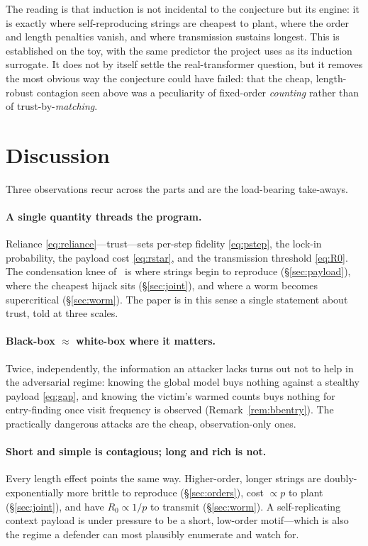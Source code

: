 \documentclass[11pt]{article}
\theoremstyle{plain}
\theoremstyle{definition}
\theoremstyle{remark}
\newcommand{\Rzero}{R_{0}}
\begin{document}
The reading is that induction is not incidental to the conjecture but its engine: it is exactly
where self-reproducing strings are cheapest to plant, where the order and length penalties
vanish, and where transmission sustains longest. This is established on the toy, with the same
predictor the project uses as its induction surrogate. It does not by itself settle the
real-transformer question, but it removes the most obvious way the conjecture could have failed:
that the cheap, length-robust contagion seen above was a peculiarity of fixed-order
\emph{counting} rather than of trust-by-\emph{matching}.

\section{Discussion}\label{sec:discussion}
Three observations recur across the parts and are the load-bearing take-aways.

\paragraph{A single quantity threads the program.} Reliance \eqref{eq:reliance}---trust---sets
per-step fidelity \eqref{eq:pstep}, the lock-in probability, the payload cost \eqref{eq:rstar},
and the transmission threshold \eqref{eq:R0}. The condensation knee of~\cite{shumow2026trust} is
where strings begin to reproduce (\S\ref{sec:payload}), where the cheapest hijack sits
(\S\ref{sec:joint}), and where a worm becomes supercritical (\S\ref{sec:worm}). The paper is in
this sense a single statement about trust, told at three scales.

\paragraph{Black-box $\approx$ white-box where it matters.} Twice, independently, the
information an attacker lacks turns out not to help in the adversarial regime: knowing the global
model buys nothing against a stealthy payload \eqref{eq:gap}, and knowing the victim's warmed
counts buys nothing for entry-finding once visit frequency is observed
(Remark~\ref{rem:bbentry}). The practically dangerous attacks are the cheap, observation-only
ones.

\paragraph{Short and simple is contagious; long and rich is not.} Every length effect points the
same way. Higher-order, longer strings are doubly-exponentially more brittle to reproduce
(\S\ref{sec:orders}), cost $\propto p$ to plant (\S\ref{sec:joint}), and have $\Rzero\propto1/p$
to transmit (\S\ref{sec:worm}). A self-replicating context payload is under pressure to be a
short, low-order motif---which is also the regime a defender can most plausibly enumerate and
watch for.
\end{document}

